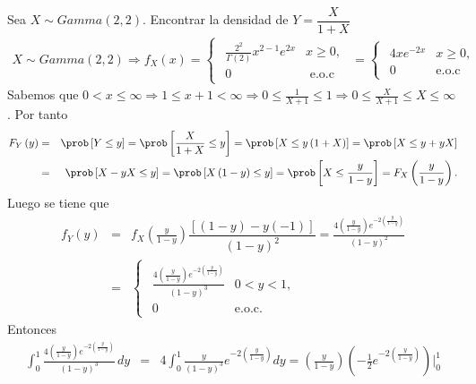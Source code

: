 \begin{Ejem}
Sea $X \sim Gamma \left(2,2 \right)$. Encontrar la densidad de $Y=\dfrac{X}{1+X}$
\begin{eqnarray*}
X \sim Gamma \left( 2,2 \right) \Rightarrow f_{X}\left( x \right)= 
\begin{cases}
\begin{array}{lc}
\frac{2^{2}}{\Gamma\left(2\right)}x^{2-1}e^{2x} & x \geq 0, \\
0 & \textrm{ e.o.c}
\end{array}
\end{cases}
=\begin{cases}
\begin{array}{lc}
4xe^{-2x} & x \geq 0, \\
0 & \textrm {e.o.c}
\end{array}
\end{cases}
\end{eqnarray*}
Sabemos que 
$0<x\leq \infty \Rightarrow 1 \leq x+1 < \infty \Rightarrow 0 \leq \frac{1}{X+1}\leq 1 \Rightarrow 0\leq\frac{X}{X+1}\leq X\leq \infty$. Por tanto
\begin{eqnarray*}
F_{Y}\left(y\right)&=&\prob\left[Y\leq y\right]=\prob \left[\frac{X}{1+X}\leq y\right]=\prob\left[X\leq y\left(1+X\right)\right]= \prob\left[X\leq y+yX\right]\\
&=&\prob\left[X-yX\leq y\right]=\prob\left[X\left(1-y\right)\leq y\right]=\prob\left[X\leq \frac{y}{1-y}\right]= F_{X}\left(\dfrac{y}{1-y}\right).
\end{eqnarray*}
Luego se tiene que
\begin{eqnarray*}
f_{Y}\left(y\right)&=&f_{X}\left(\frac{y}{1-y}\right)\dfrac{\left[\left(1-y\right)-y\left(-1\right)\right]}{\left(1-y\right)^{2}}=\frac{4\left(\frac{y}{1-y}\right)e^{-2\left(\frac{y}{1-y}\right)}}{\left(1-y\right)^{2}}\\
&=&\begin{cases}
\begin{array}{cc}
\frac{4\left(\frac{y}{1-y}\right)e^{-2\left(\frac{y}{1-y}\right)}}{\left(1-y\right)^{3}} & 0<y<1, \\
0 & \textrm {e.o.c.}
\end{array}
\end{cases}
\end{eqnarray*}
Entonces
\begin{eqnarray*}
\int_{0}^{1}\frac{4\left(\frac{y}{1-y}\right)e^{-2\left(\frac{y}{1-y}\right)}}{\left(1-y\right)^{3}}\, dy &=& 4\int_{0}^{1}\frac{y}{\left(1-y\right)^3}e^{-2\left(\frac{y}{1-y}\right)}dy = \left(\frac{y}{1-y}\right)\left(-\frac{1}{2}e^{-2\left(\frac{y}{1-y}\right)}\right)\vert_{0}^{1}\\

\end{eqnarray*}
\end{Ejem}
